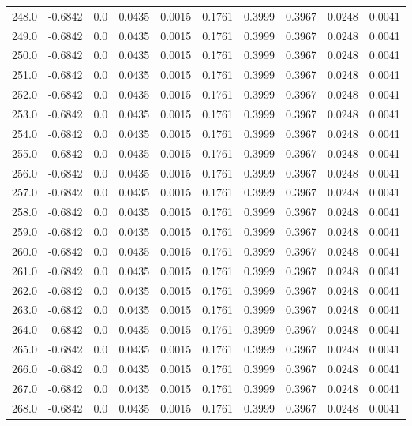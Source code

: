 \begin{longtable}{lrrrrrrrrr}
248.0 & -0.6842 & 0.0 & 0.0435 & 0.0015 & 0.1761 & 0.3999 & 0.3967 & 0.0248 & 0.0041 \\
249.0 & -0.6842 & 0.0 & 0.0435 & 0.0015 & 0.1761 & 0.3999 & 0.3967 & 0.0248 & 0.0041 \\
250.0 & -0.6842 & 0.0 & 0.0435 & 0.0015 & 0.1761 & 0.3999 & 0.3967 & 0.0248 & 0.0041 \\
251.0 & -0.6842 & 0.0 & 0.0435 & 0.0015 & 0.1761 & 0.3999 & 0.3967 & 0.0248 & 0.0041 \\
252.0 & -0.6842 & 0.0 & 0.0435 & 0.0015 & 0.1761 & 0.3999 & 0.3967 & 0.0248 & 0.0041 \\
253.0 & -0.6842 & 0.0 & 0.0435 & 0.0015 & 0.1761 & 0.3999 & 0.3967 & 0.0248 & 0.0041 \\
254.0 & -0.6842 & 0.0 & 0.0435 & 0.0015 & 0.1761 & 0.3999 & 0.3967 & 0.0248 & 0.0041 \\
255.0 & -0.6842 & 0.0 & 0.0435 & 0.0015 & 0.1761 & 0.3999 & 0.3967 & 0.0248 & 0.0041 \\
256.0 & -0.6842 & 0.0 & 0.0435 & 0.0015 & 0.1761 & 0.3999 & 0.3967 & 0.0248 & 0.0041 \\
257.0 & -0.6842 & 0.0 & 0.0435 & 0.0015 & 0.1761 & 0.3999 & 0.3967 & 0.0248 & 0.0041 \\
258.0 & -0.6842 & 0.0 & 0.0435 & 0.0015 & 0.1761 & 0.3999 & 0.3967 & 0.0248 & 0.0041 \\
259.0 & -0.6842 & 0.0 & 0.0435 & 0.0015 & 0.1761 & 0.3999 & 0.3967 & 0.0248 & 0.0041 \\
260.0 & -0.6842 & 0.0 & 0.0435 & 0.0015 & 0.1761 & 0.3999 & 0.3967 & 0.0248 & 0.0041 \\
261.0 & -0.6842 & 0.0 & 0.0435 & 0.0015 & 0.1761 & 0.3999 & 0.3967 & 0.0248 & 0.0041 \\
262.0 & -0.6842 & 0.0 & 0.0435 & 0.0015 & 0.1761 & 0.3999 & 0.3967 & 0.0248 & 0.0041 \\
263.0 & -0.6842 & 0.0 & 0.0435 & 0.0015 & 0.1761 & 0.3999 & 0.3967 & 0.0248 & 0.0041 \\
264.0 & -0.6842 & 0.0 & 0.0435 & 0.0015 & 0.1761 & 0.3999 & 0.3967 & 0.0248 & 0.0041 \\
265.0 & -0.6842 & 0.0 & 0.0435 & 0.0015 & 0.1761 & 0.3999 & 0.3967 & 0.0248 & 0.0041 \\
266.0 & -0.6842 & 0.0 & 0.0435 & 0.0015 & 0.1761 & 0.3999 & 0.3967 & 0.0248 & 0.0041 \\
267.0 & -0.6842 & 0.0 & 0.0435 & 0.0015 & 0.1761 & 0.3999 & 0.3967 & 0.0248 & 0.0041 \\
268.0 & -0.6842 & 0.0 & 0.0435 & 0.0015 & 0.1761 & 0.3999 & 0.3967 & 0.0248 & 0.0041 \\

\end{longtable}
